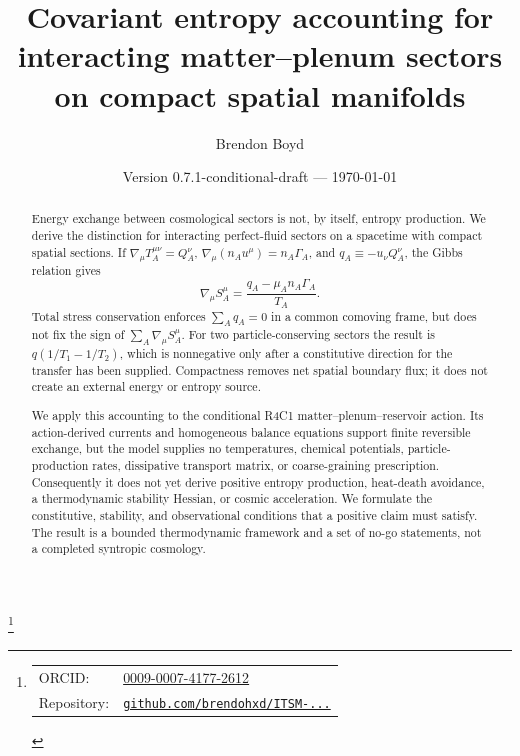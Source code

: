 \documentclass[aps,prd,reprint,superscriptaddress,nofootinbib,floatfix]{revtex4-2}
\begin{document}
\title{Covariant entropy accounting for interacting matter--plenum sectors
on compact spatial manifolds}

\author{Brendon Boyd}
\thanks{%
\begin{tabular}{@{}l@{\ }l@{}}
ORCID: & \href{https://orcid.org/0009-0007-4177-2612}{0009-0007-4177-2612} \\
Repository: & \href{https://github.com/brendohxd/ITSM-Integrated-Toroidal-Syntropic-Model}{\texttt{github.com/brendohxd/ITSM-...}} \\
\end{tabular}%
}

\date{Version 0.7.1-conditional-draft --- \today}

\begin{abstract}
Energy exchange between cosmological sectors is not, by itself, entropy
production.  We derive the distinction for interacting perfect-fluid sectors
on a spacetime with compact spatial sections.  If
\(\nabla_\mu T_A^{\mu\nu}=Q_A^\nu\),
\(\nabla_\mu(n_Au^\mu)=n_A\Gamma_A\), and
\(q_A\equiv-u_\nu Q_A^\nu\), the Gibbs relation gives
\[
 \nabla_\mu S_A^\mu
 =\frac{q_A-\mu_A n_A\Gamma_A}{T_A}.
\]
Total stress conservation enforces \(\sum_A q_A=0\) in a common comoving
frame, but does not fix the sign of \(\sum_A\nabla_\mu S_A^\mu\).
For two particle-conserving sectors the result is
\(q(1/T_1-1/T_2)\), which is nonnegative only after a constitutive direction
for the transfer has been supplied.  Compactness removes net spatial boundary
flux; it does not create an external energy or entropy source.

We apply this accounting to the conditional R4C1 matter--plenum--reservoir
action.  Its action-derived currents and homogeneous balance equations support
finite reversible exchange, but the model supplies no temperatures, chemical
potentials, particle-production rates, dissipative transport matrix, or
coarse-graining prescription.  Consequently it does not yet derive positive
entropy production, heat-death avoidance, a thermodynamic stability Hessian,
or cosmic acceleration.  We formulate the constitutive, stability, and
observational conditions that a positive claim must satisfy.  The result is a
bounded thermodynamic framework and a set of no-go statements, not a completed
syntropic cosmology.
\end{abstract}

\end{document}
